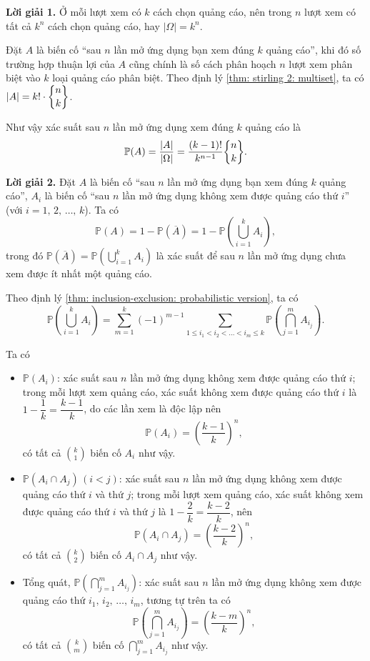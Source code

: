 \textbf{Lời giải 1. }Ở mỗi lượt xem có $k$ cách chọn quảng cáo, nên trong $n$ lượt xem có tất cả $k^n$ cách chọn quảng cáo, hay $|\Omega| = k^n$.

Đặt $A$ là biến cố ``sau $n$ lần mở ứng dụng bạn xem đúng $k$ quảng cáo'', khi đó số trường hợp thuận lợi của $A$ cũng chính là số cách phân hoạch $n$ lượt xem phân biệt vào $k$ loại quảng cáo phân biệt. Theo định lý \ref{thm: stirling 2: multiset}, ta có $\displaystyle |A| = k! \cdot \stirlingII{n}{k}$.

Như vậy xác suất sau $n$ lần mở ứng dụng xem đúng $k$ quảng cáo là $$\mathbb{P}(A) = \dfrac{|A|}{|\Omega|} = \dfrac{(k-1)!}{k^{n-1}}\stirlingII{n}{k}.$$

\textbf{Lời giải 2. }Đặt $A$ là biến cố ``sau $n$ lần mở ứng dụng bạn xem đúng $k$ quảng cáo'', $A_i$ là biến cố ``sau $n$ lần mở ứng dụng không xem được quảng cáo thứ $i$'' (với $i = 1,\,2,\,\ldots,\,k$). Ta có 
$$\mathbb{P}(A) = 1 - \mathbb{P}(\overline{A}) = 1 - \mathbb{P}\left(\bigcup_{i=1}^k A_i\right),$$
trong đó $\displaystyle\mathbb{P}(\overline{A}) = \mathbb{P}\left(\bigcup_{i=1}^k A_i\right)$ là xác suất để sau $n$ lần mở ứng dụng chưa xem được ít nhất một quảng cáo.

Theo định lý \ref{thm: inclusion-exclusion: probabilistic version}, ta có $$\mathbb{P}\left(\bigcup_{i=1}^k A_i\right) = \sum_{m=1}^k (-1)^{m-1}\sum_{1 \leq i_1 < i_2 < \ldots < i_m \leq k} \mathbb{P}\left(\bigcap_{j=1}^m A_{i_j}\right).$$

Ta có 
\begin{itemize}
    \item $\mathbb{P}(A_i)$: xác suất sau $n$ lần mở ứng dụng không xem được quảng cáo thứ $i$; trong mỗi lượt xem quảng cáo, xác suất không xem được quảng cáo thứ $i$ là $1 - \dfrac{1}{k} = \dfrac{k-1}{k}$, do các lần xem là độc lập nên $$\mathbb{P}(A_i) = \left(\dfrac{k-1}{k}\right)^n,$$ có tất cả $\displaystyle{k \choose 1}$ biến cố $A_i$ như vậy.
    \item $\mathbb{P}(A_i \cap A_j)\,(i < j)$: xác suất sau $n$ lần mở ứng dụng không xem được quảng cáo thứ $i$ và thứ $j$; trong mỗi lượt xem quảng cáo, xác suất không xem được quảng cáo thứ $i$ và thứ $j$ là $1 - \dfrac{2}{k} = \dfrac{k-2}{k}$, nên $$\mathbb{P}(A_i \cap A_j) = \left(\dfrac{k-2}{k}\right)^n,$$ có tất cả $\displaystyle{k \choose 2}$ biến cố $A_i \cap A_j$ như vậy.
    \item Tổng quát, $\displaystyle\mathbb{P}\left(\bigcap_{j=1}^m A_{i_j}\right)$: xác suất sau $n$ lần mở ứng dụng không xem được quảng cáo thứ $i_1,\,i_2,\,\ldots,\,i_m$, tương tự trên ta có $$\displaystyle\mathbb{P}\left(\bigcap_{j=1}^m A_{i_j}\right) = \left(\dfrac{k-m}{k}\right)^n,$$ có tất cả $\displaystyle{k \choose m}$ biến cố $\displaystyle \bigcap_{j=1}^m A_{i_j}$ như vậy.
\end{itemize}

